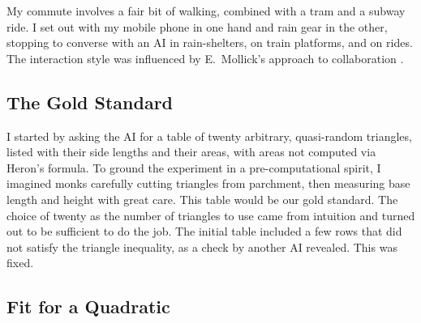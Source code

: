 \documentclass[10.5pt]
{amsart}
\begin{document}
My commute involves a fair bit of walking, combined with a tram and a subway ride. I set out with my mobile phone in one hand and rain gear in the other, stopping to converse with an AI in rain-shelters, on train platforms, and on rides. The interaction style was influenced by E.~Mollick's approach to collaboration \cite{mollick-2024}.

\subsection{The Gold Standard}

I started by asking the AI for a table of twenty arbitrary, quasi-random triangles, listed with their side lengths and their areas, with areas not computed via Heron's formula. To ground the experiment in a pre-computational spirit, I imagined monks carefully cutting triangles from parchment, then measuring base length and height with great care. This table would be our gold standard. The choice of twenty as the number of triangles to use came from intuition and turned out to be sufficient to do the job. The initial table included a few rows that did not satisfy the triangle inequality, as a check by another AI revealed. This was fixed.

\subsection{Fit for a Quadratic}
\end{document}
